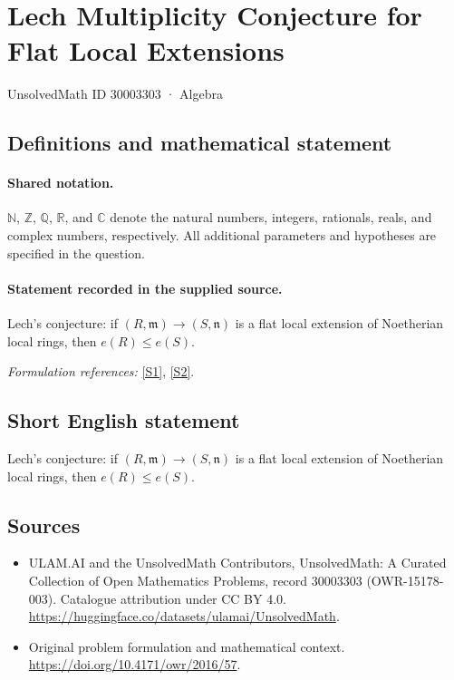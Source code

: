 \documentclass[11pt]{article}
\newcommand{\sref}[2]{\hyperlink{source:#1:#2}{[S#2]}}
\begin{document}
\setcounter{section}{30003302}
\section{Lech Multiplicity Conjecture for Flat Local Extensions}\label{30003303}
{\small UnsolvedMath ID 30003303 · Algebra}
\subsection{Definitions and mathematical statement}

\paragraph{Shared notation.}$\mathbb N$, $\mathbb Z$, $\mathbb Q$, $\mathbb R$, and $\mathbb C$ denote the natural numbers, integers, rationals, reals, and complex numbers, respectively. All additional parameters and hypotheses are specified in the question.


\paragraph{Statement recorded in the supplied source.}
Lech's conjecture: if $(R,\mathfrak m)\to(S,\mathfrak n)$ is a flat local extension of Noetherian local rings, then $e(R)\leq e(S)$.
\par\smallskip\textit{Formulation references:} \sref{30003303}{1}, \sref{30003303}{2}.
\subsection{Short English statement}
Lech's conjecture: if $(R,\mathfrak m)\to(S,\mathfrak n)$ is a flat local extension of Noetherian local rings, then $e(R)\leq e(S)$.
\subsection{Sources}
\begin{itemize}
\item[\hypertarget{source:30003303:1}{S1}] ULAM.AI and the UnsolvedMath Contributors, UnsolvedMath: A Curated Collection of Open Mathematics Problems, record 30003303 (OWR-15178-003). Catalogue attribution under CC BY 4.0.
\url{https://huggingface.co/datasets/ulamai/UnsolvedMath}.
\item[\hypertarget{source:30003303:2}{S2}] Original problem formulation and mathematical context.
\url{https://doi.org/10.4171/owr/2016/57}.
\end{itemize}
\label{end:30003303}
\end{document}
